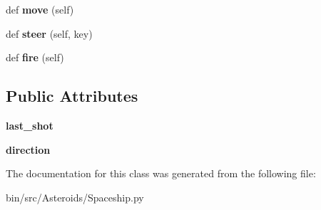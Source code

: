 \begin{DoxyCompactItemize}
\item 
def {\bfseries move} (self)\hypertarget{classSpaceship_1_1Spaceship_a9ed1701b8506b3287a3c0f376965eaa3}{}\label{classSpaceship_1_1Spaceship_a9ed1701b8506b3287a3c0f376965eaa3}

\item 
def {\bfseries steer} (self, key)\hypertarget{classSpaceship_1_1Spaceship_aaad85580a083d4fbb6c839f98224a6c5}{}\label{classSpaceship_1_1Spaceship_aaad85580a083d4fbb6c839f98224a6c5}

\item 
def {\bfseries fire} (self)\hypertarget{classSpaceship_1_1Spaceship_a7cf6faeb7488ab1a77fc5668076c1f35}{}\label{classSpaceship_1_1Spaceship_a7cf6faeb7488ab1a77fc5668076c1f35}

\end{DoxyCompactItemize}
\subsection*{Public Attributes}
\begin{DoxyCompactItemize}
\item 
{\bfseries last\+\_\+shot}\hypertarget{classSpaceship_1_1Spaceship_a56057cc944d63397439253ba0a070fce}{}\label{classSpaceship_1_1Spaceship_a56057cc944d63397439253ba0a070fce}

\item 
{\bfseries direction}\hypertarget{classSpaceship_1_1Spaceship_a8066f1ca4ab44ccd8287634d79607bd6}{}\label{classSpaceship_1_1Spaceship_a8066f1ca4ab44ccd8287634d79607bd6}

\end{DoxyCompactItemize}


The documentation for this class was generated from the following file\+:\begin{DoxyCompactItemize}
\item 
bin/src/\+Asteroids/Spaceship.\+py\end{DoxyCompactItemize}
